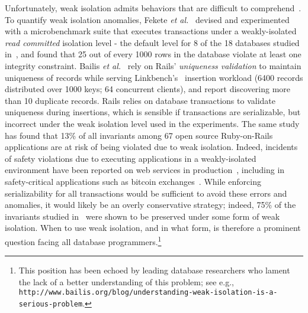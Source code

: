 Unfortunately, weak isolation admits behaviors that are difficult to
comprehend~\cite{berenson}. To quantify weak isolation anomalies,
Fekete \emph{et al.}~\cite{feketevldb09} devised and experimented with
a microbenchmark suite that executes transactions under a
weakly-isolated \emph{read committed} isolation level - the default
level for 8 of the 18 databases studied in~\cite{bailishotos}, and
found that 25 out of every 1000 rows in the database violate at least
one integrity constraint. Bailis \emph{et al.}~\cite{bailisferal} rely
on Rails' \emph{uniqueness validation} to maintain uniqueness of
records while serving Linkbench's~\cite{linkbench} insertion workload
(6400 records distributed over 1000 keys; 64 concurrent clients), and
report discovering more than 10 duplicate records.  Rails relies on
database transactions to validate uniqueness during insertions, which
is sensible if transactions are serializable, but incorrect under the
weak isolation level used in the experiments. The same study has found
that 13\% of all invariants among 67 open source Ruby-on-Rails
applications are at risk of being violated due to weak
isolation. Indeed, incidents of safety violations due to executing
applications in a weakly-isolated environment have been reported on
web services in production~\cite{starbucksbug, scimedbug}, including
in safety-critical applications such as bitcoin
exchanges~\cite{poloniexbug, bitcoinbug}. While enforcing
serializability for all transactions would be sufficient to avoid
these errors and anomalies, it would likely be an overly conservative
strategy; indeed, 75\% of the invariants studied in~\cite{bailisferal}
were shown to be preserved under some form of weak isolation.  When to
use weak isolation, and in what form, is therefore a prominent
question facing all database programmers.\footnote{This position has
been echoed by leading database researchers who lament the lack of a
better understanding of this problem; see e.g., {\tt
  http://www.bailis.org/blog/understanding-weak-isolation-is-a-serious-problem}.}

